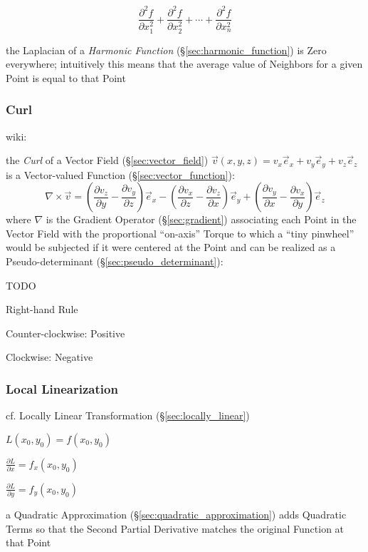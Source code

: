 \[
  \frac{\partial^2 f}{\partial{x_1^2}} +
  \frac{\partial^2 f}{\partial{x_2^2}} +
  \cdots +
  \frac{\partial^2 f}{\partial{x_n^2}}
\]

the Laplacian of a \emph{Harmonic Function} (\S\ref{sec:harmonic_function}) is
Zero everywhere; intuitively this means that the average value of Neighbors for
a given Point is equal to that Point



\subsubsection{Curl}\label{sec:curl}

wiki:

the \emph{Curl} of a Vector Field (\S\ref{sec:vector_field}) $\vec{v}(x,y,z) =
v_x\vec{e}_x + v_y\vec{e}_y + v_z\vec{e}_z$ is a Vector-valued Function
(\S\ref{sec:vector_function}):
\[
  \nabla\times\vec{v} =
    (\frac{\partial v_z}{\partial y}-\frac{\partial v_y}{\partial z})\vec{e}_x -
    (\frac{\partial v_x}{\partial z}-\frac{\partial v_z}{\partial x})\vec{e}_y +
    (\frac{\partial v_y}{\partial x}-\frac{\partial v_x}{\partial y})\vec{e}_z
\]
where $\nabla$ is the Gradient Operator (\S\ref{sec:gradient}) associating each
Point in the Vector Field with the proportional ``on-axis'' Torque to which a
``tiny pinwheel'' would be subjected if it were centered at the Point and can
be realized as a Pseudo-determinant (\S\ref{sec:pseudo_determinant}):

TODO

Right-hand Rule

Counter-clockwise: Positive

Clockwise: Negative



\subsubsection{Local Linearization}\label{sec:local_linearization}

\fist cf. Locally Linear Transformation (\S\ref{sec:locally_linear})

$L(x_0,y_0) = f(x_0,y_0)$

$\frac{\partial{L}}{\partial{x}} = f_x(x_0,y_0)$

$\frac{\partial{L}}{\partial{y}} = f_y(x_0,y_0)$

a Quadratic Approximation (\S\ref{sec:quadratic_approximation}) adds Quadratic
Terms so that the Second Partial Derivative matches the original Function at
that Point

